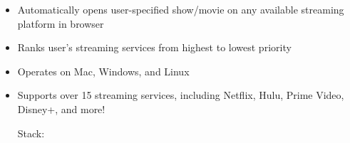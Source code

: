 \documentclass[10pt,a4paper,ragged2e,withhyper]{altacv}
\begin{document}
\begin{paracol}{2}
\begin{itemize}
\end{itemize}

\medskip






\begin{itemize}
\item Automatically opens user-specified show/movie on any available streaming platform in browser
\item Ranks user's streaming services from highest to lowest priority
\item Operates on Mac, Windows, and Linux
\item Supports over 15 streaming services, including Netflix, Hulu, Prime Video, Disney+, and more!

\smallskip
Stack:

\end{itemize}




\end{paracol}
\end{document}
